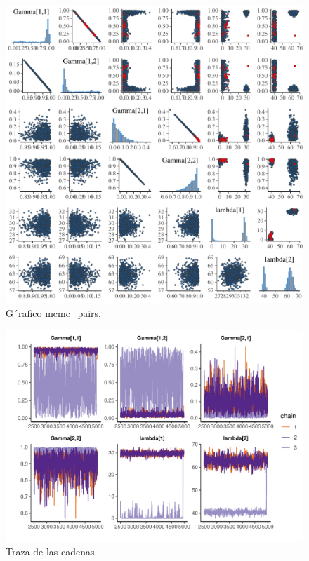 \documentclass[a4paper]{article}\usepackage[]{graphicx}\usepackage[]{color}
\makeatletter
\def\maxwidth{ %
  \ifdim\Gin@nat@width>\linewidth
    \linewidth
  \else
    \Gin@nat@width
  \fi
}
\newenvironment{knitrout}{}{} %
\makeatother
\begin{document}
\begin{knitrout}
\color{fgcolor}\begin{figure}
\includegraphics[width=\maxwidth]{figure/unnamed-chunk-30-1} \caption[G´rafico mcmc_pairs]{G´rafico mcmc_pairs.}\label{fig:unnamed-chunk-30}
\end{figure}


\end{knitrout}

\begin{knitrout}
\color{fgcolor}\begin{figure}
\includegraphics[width=\maxwidth]{figure/unnamed-chunk-31-1} \caption[Traza de las cadenas]{Traza de las cadenas.}\label{fig:unnamed-chunk-31}
\end{figure}


\end{knitrout}
\end{document}
